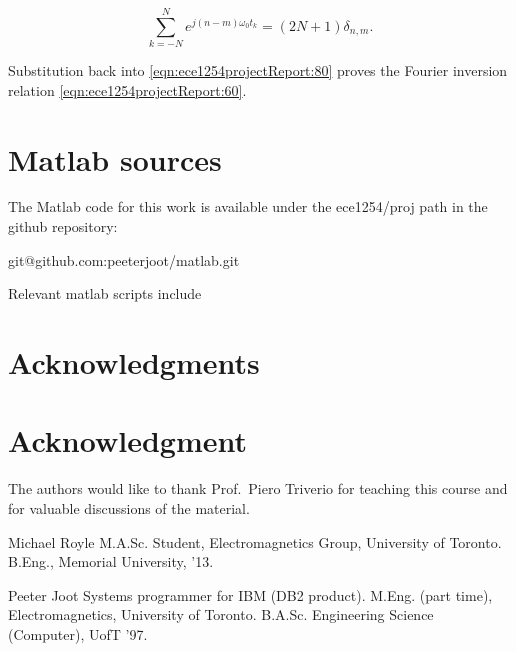 \documentclass[12pt,journal,compsoc]{../ieeepaper/IEEEtran}
\begin{document}
\begin{equation}\label{eqn:ece1254projectReport:120}
\sum_{k = -N}^N 
e^{ j (n -m )\omega_0 t_k} = (2 N + 1) \delta_{n,m}.
\end{equation}

Substitution back into \cref{eqn:ece1254projectReport:80} proves the Fourier inversion relation \cref{eqn:ece1254projectReport:60}.

\section{Matlab sources}
\label{appendix:matlab}

The Matlab code for this work is available under the ece1254/proj path in the github repository:

\begin{center}
git@github.com:peeterjoot/matlab.git
\end{center}

Relevant matlab scripts include




\ifCLASSOPTIONcompsoc
  \section*{Acknowledgments}
\else
  \section*{Acknowledgment}
\fi


The authors would like to thank Prof.\ Piero Triverio for teaching this course and for valuable discussions of the material.

\ifCLASSOPTIONcaptionsoff
  \newpage
\fi


\label{app:bibliography}


\begin{IEEEbiography}{Michael Royle}
M.A.Sc. Student, Electromagnetics Group, University of Toronto. B.Eng., Memorial University, '13. 
\end{IEEEbiography}

\begin{IEEEbiography}{Peeter Joot}
Systems programmer for IBM (DB2 product).  M.Eng. (part time), Electromagnetics, University of Toronto. B.A.Sc. Engineering Science (Computer), UofT '97. 
\end{IEEEbiography}
\end{document}
